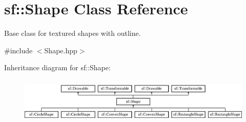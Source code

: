 \hypertarget{classsf_1_1_shape}{\section{sf\-:\-:Shape Class Reference}
\label{classsf_1_1_shape}
}


Base class for textured shapes with outline.  




{\ttfamily \#include $<$Shape.\-hpp$>$}

Inheritance diagram for sf\-:\-:Shape\-:\begin{figure}[H]
\begin{center}
\leavevmode
\includegraphics[height=2.187500cm]{classsf_1_1_shape}
\end{center}
\end{figure}
